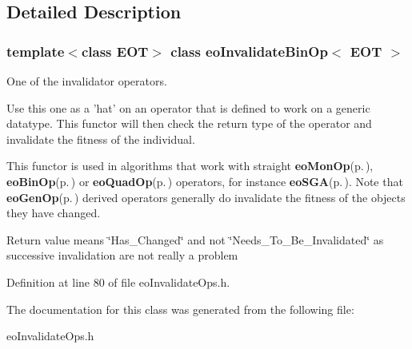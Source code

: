 \subsection{Detailed Description}
\subsubsection*{template$<$class EOT$>$ class eo\-Invalidate\-Bin\-Op$<$ EOT $>$}

One of the invalidator operators. 

Use this one as a 'hat' on an operator that is defined to work on a generic datatype. This functor will then check the return type of the operator and invalidate the fitness of the individual.

This functor is used in algorithms that work with straight {\bf eo\-Mon\-Op}{\rm (p.\,\pageref{classeo_mon_op})}, {\bf eo\-Bin\-Op}{\rm (p.\,\pageref{classeo_bin_op})} or {\bf eo\-Quad\-Op}{\rm (p.\,\pageref{classeo_quad_op})} operators, for instance {\bf eo\-SGA}{\rm (p.\,\pageref{classeo_s_g_a})}. Note that {\bf eo\-Gen\-Op}{\rm (p.\,\pageref{classeo_gen_op})} derived operators generally do invalidate the fitness of the objects they have changed.

Return value means \char`\"{}Has\_\-Changed\char`\"{} and not \char`\"{}Needs\_\-To\_\-Be\_\-Invalidated\char`\"{} as successive invalidation are not really a problem 



Definition at line 80 of file eo\-Invalidate\-Ops.h.

The documentation for this class was generated from the following file:\begin{CompactItemize}
\item 
eo\-Invalidate\-Ops.h\end{CompactItemize}
